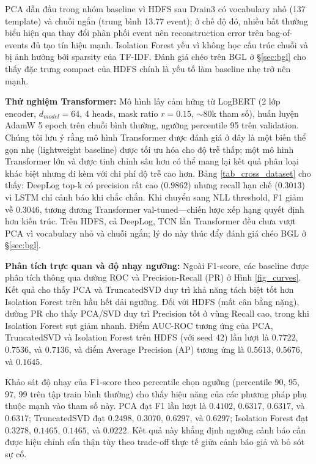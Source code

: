 \documentclass[conference]{IEEEtran}
\begin{document}
PCA dẫn đầu trong nhóm baseline vì HDFS sau Drain3 có vocabulary nhỏ (137 template) và chuỗi ngắn (trung bình 13.77 event); ở chế độ đó, nhiều bất thường biểu hiện qua thay đổi phân phối event nên reconstruction error trên bag-of-events đủ tạo tín hiệu mạnh. Isolation Forest yếu vì không học cấu trúc chuỗi và bị ảnh hưởng bởi sparsity của TF-IDF. Đánh giá chéo trên BGL ở §\ref{sec:bgl} cho thấy đặc trưng compact của HDFS chính là yếu tố làm baseline nhẹ trở nên mạnh.

\textbf{Thử nghiệm Transformer:} Mô hình lấy cảm hứng từ LogBERT \cite{b2} (2 lớp encoder, $d_{model}{=}64$, 4 heads, mask ratio $r{=}0.15$, $\sim$80k tham số), huấn luyện AdamW \cite{b17} 5 epoch trên chuỗi bình thường, ngưỡng percentile 95 trên validation. Chúng tôi lưu ý rằng mô hình Transformer được đánh giá ở đây là một biến thể gọn nhẹ (lightweight baseline) được tối ưu hóa cho độ trễ thấp; một mô hình Transformer lớn và được tinh chỉnh sâu hơn có thể mang lại kết quả phân loại khác biệt nhưng đi kèm với chi phí độ trễ cao hơn. Bảng \ref{tab_cross_dataset} cho thấy: DeepLog top-k có precision rất cao ($0.9862$) nhưng recall hạn chế ($0.3013$) vì LSTM chỉ cảnh báo khi chắc chắn. Khi chuyển sang NLL threshold, F1 giảm về $0.3046$, tương đương Transformer val-tuned---chiến lược xếp hạng quyết định hơn kiến trúc. Trên HDFS, cả DeepLog, TCN lẫn Transformer đều chưa vượt PCA vì vocabulary nhỏ và chuỗi ngắn; lý do này thúc đẩy đánh giá chéo BGL ở §\ref{sec:bgl}.

\textbf{Phân tích trực quan và độ nhạy ngưỡng:} Ngoài F1-score, các baseline được phân tích thông qua đường ROC và Precision-Recall (PR) ở Hình \ref{fig_curves}. Kết quả cho thấy PCA và TruncatedSVD duy trì khả năng tách biệt tốt hơn Isolation Forest trên hầu hết dải ngưỡng. Đối với HDFS (mất cân bằng nặng), đường PR cho thấy PCA/SVD duy trì Precision tốt ở vùng Recall cao, trong khi Isolation Forest sụt giảm nhanh. Điểm AUC-ROC tương ứng của PCA, TruncatedSVD và Isolation Forest trên HDFS (với seed 42) lần lượt là $0.7722$, $0.7536$, và $0.7136$, và điểm Average Precision (AP) tương ứng là $0.5613$, $0.5676$, và $0.1645$.

Khảo sát độ nhạy của F1-score theo percentile chọn ngưỡng (percentile 90, 95, 97, 99 trên tập train bình thường) cho thấy hiệu năng của các phương pháp phụ thuộc mạnh vào tham số này. PCA đạt F1 lần lượt là $0.4102$, $0.6317$, $0.6317$, và $0.6317$; TruncatedSVD đạt $0.2498$, $0.3070$, $0.6297$, và $0.6297$; Isolation Forest đạt $0.3278$, $0.1465$, $0.1465$, và $0.0222$. Kết quả này khẳng định ngưỡng cảnh báo cần được hiệu chỉnh cẩn thận tùy theo trade-off thực tế giữa cảnh báo giả và bỏ sót sự cố.
\end{document}
